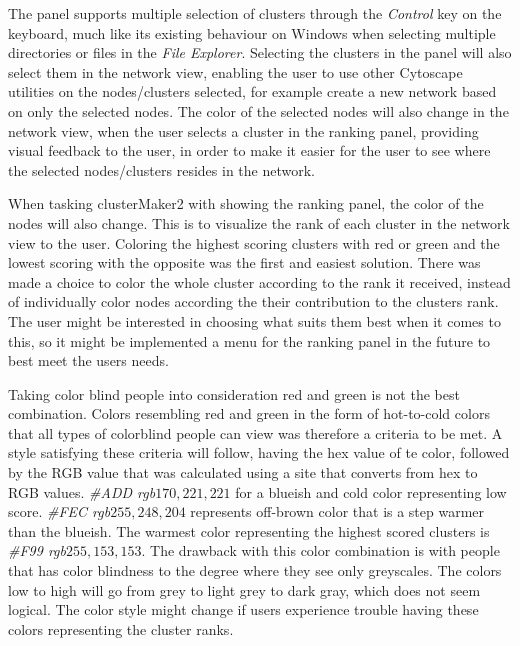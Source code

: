 The panel supports multiple selection of clusters through the \textit{Control}
key on the keyboard, much like its existing behaviour on Windows when selecting
multiple directories or files in the \textit{File Explorer}. Selecting the
clusters in the panel will also select them in the network view, enabling the
user to use other Cytoscape utilities on the nodes/clusters selected, for
example create a new network based on only the selected nodes. The color of the
selected nodes will also change in the network view, when the user selects a
cluster in the ranking panel, providing visual feedback to the user, in order to
make it easier for the user to see where the selected nodes/clusters resides in
the network.

When tasking clusterMaker2 with showing the ranking panel, the color of the
nodes will also change. This is to visualize the rank of each cluster in the
network view to the user. Coloring the highest scoring clusters with red or
green and the lowest scoring with the opposite was the first and easiest
solution. There was made a choice to color the whole cluster according to the
rank it received, instead of individually color nodes according the their
contribution to the clusters rank. The user might be interested in choosing what
suits them best when it comes to this, so it might be implemented a menu for the
ranking panel in the future to best meet the users needs.

Taking color blind people into consideration red and green is not the
best combination. Colors resembling red and green in the form of hot-to-cold
colors that all types of colorblind people can view was therefore a criteria to
be met. A style satisfying these criteria will follow, having the hex value of
te color\cite{color-blindness3}, followed by the RGB value that was calculated
using a site that converts from hex to RGB values\cite{color-blindness2}.
\textit{\#ADD rgb\(170,221,221\)} for a blueish and cold color representing low
score. \textit{\#FEC rgb\(255,248,204\)} represents off-brown color that is a step
warmer than the blueish. The warmest color representing the highest scored
clusters is \textit{\#F99 rgb\(255,153,153\)}. The drawback with this color
combination is with people that has color blindness to the degree where they see
only greyscales. The colors low to high will go from grey to light grey to dark
gray, which does not seem logical. The color style might change if users
experience trouble having these colors representing the cluster ranks. 

